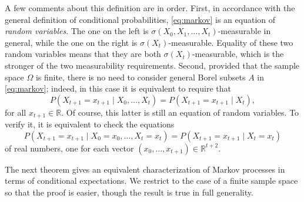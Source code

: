 \documentclass[reqno]{amsart}
\theoremstyle{definition}
\numberwithin{equation}{section}
\begin{document}
A few comments about this definition are in order. First, in accordance with the general definition of conditional probabilities, \eqref{eq:markov} is an equation of \textit{random variables}. The one on the left is $\sigma(X_0,X_1,\ldots,X_t)$-measurable in general, while the one on the right is $\sigma(X_t)$-measurable. Equality of these two random variables means that they are both $\sigma(X_t)$-measurable, which is the stronger of the two measurability requirements. Second, provided that the sample space $\Omega$ is finite, there is no need to consider general Borel subsets $A$ in \eqref{eq:markov}; indeed, in this case it is equivalent to require that
	\begin{equation}\label{eq:markov-2}
	P\left( X_{t+1} = x_{t+1} \mid X_0, \ldots,X_t \right) = P \left( X_{t+1} = x_{t+1} \mid X_t \right),
	\end{equation}
for all $x_{t+1}\in \mathbb{R}$. Of course, this latter is still an equation of random variables. To verify it, it is equivalent to check the equations
	\[
	P\left( X_{t+1} = x_{t+1} \mid X_0=x_0, \ldots,X_t=x_t \right) = P \left( X_{t+1} = x_{t+1} \mid X_t=x_t \right)
	\]
of real numbers, one for each vector $(x_0,\ldots,x_{t+1})\in \mathbb{R}^{t+2}$.

The next theorem gives an equivalent characterization of Markov processes in terms of conditional expectations. We restrict to the case of a finite sample space so that the proof is easier, though the result is true in full generality.
\end{document}
